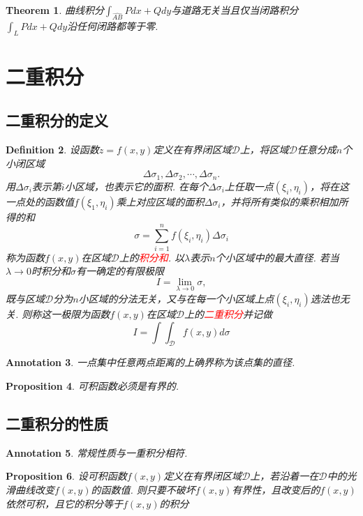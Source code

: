 \documentclass{article}
\newtheorem{theorem}{Theorem}[section]
\newtheorem{proposition}[theorem]{Proposition}
\newtheorem{definition}[theorem]{Definition}
\newtheorem{annotation}[theorem]{Annotation}
\newcommand{\redt}[1]{\textcolor{red}{#1}}
\begin{document}
\begin{theorem}
\rm 曲线积分$\int_{\widehat{AB}} Pdx+Qdy$与道路无关当且仅当闭路积分$\int_L Pdx+Qdy$沿任何闭路都等于零. 
\end{theorem}

\newpage
\section{二重积分}

\subsection{二重积分的定义}
\begin{definition}
\rm 设函数$z=f(x,y)$定义在有界闭区域$\mathcal{D}$上，将区域$\mathcal{D}$任意分成$n$个小闭区域
$$
\Delta\sigma_1,\Delta\sigma_2,\cdots,\Delta\sigma_n.
$$
用$\Delta\sigma_i$表示第$i$小区域，也表示它的面积. 在每个$\Delta\sigma_i$上任取一点$(\xi_i,\eta_i)$，将在这一点处的函数值$f(\xi_1,\eta_i)$乘上对应区域的面积$\Delta\sigma_i$，并将所有类似的乘积相加所得的和
$$
\sigma = \sum\limits_{i=1}^n f(\xi_i,\eta_i)\Delta\sigma_i
$$
称为函数$f(x,y)$在区域$\mathcal{D}$上的\redt{积分和}. 以$\lambda$表示$n$个小区域中的最大直径. 若当$\lambda \to 0$时积分和$\sigma$有一确定的有限极限
$$
I = \lim\limits_{\lambda \to 0}\sigma,
$$
既与区域$\mathcal{D}$分为$n$小区域的分法无关，又与在每一个小区域上点$(\xi_i,\eta_i)$选法也无关. 则称这一极限为函数$f(x,y)$在区域$\mathcal{D}$上的\redt{二重积分}并记做
$$
I = \int\int_{\mathcal{D}}f(x,y)d\mathcal{\sigma}
$$
\end{definition}

\begin{annotation}
\rm 一点集中任意两点距离的上确界称为该点集的直径. 
\end{annotation}

\begin{proposition}
\rm 可积函数必须是有界的.
\end{proposition}

\subsection{二重积分的性质}

\begin{annotation}
\rm 常规性质与一重积分相符.
\end{annotation}

\begin{proposition}
\rm 设可积函数$f(x,y)$定义在有界闭区域$\mathcal{D}$上，若沿着一在$\mathcal{D}$中的光滑曲线改变$f(x,y)$的函数值. 则只要不破坏$f(x,y)$有界性，且改变后的$f(x,y)$依然可积，且它的积分等于$f(x,y)$的积分
\end{proposition}
\end{document}
